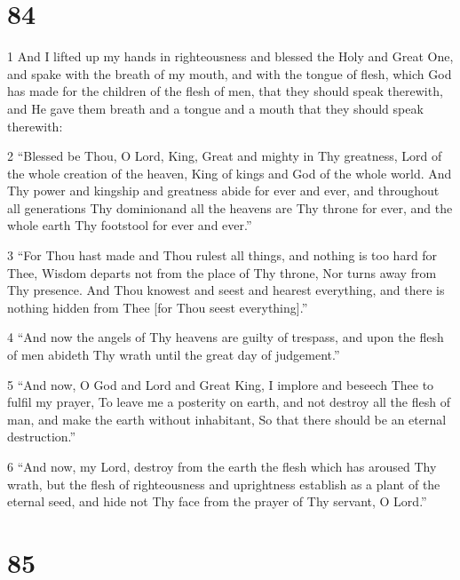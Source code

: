 \chapter{84}

\par 1 And I lifted up my hands in righteousness and blessed the Holy and Great One, and spake with the breath of my mouth, and with the tongue of flesh, which God has made for the children of the flesh of men, that they should speak therewith, and He gave them breath and a tongue and a mouth that they should speak therewith:
\par 2 “Blessed be Thou, O Lord, King, Great and mighty in Thy greatness, Lord of the whole creation of the heaven, King of kings and God of the whole world. And Thy power and kingship and greatness abide for ever and ever, and throughout all generations Thy dominionand all the heavens are Thy throne for ever, and the whole earth Thy footstool for ever and ever.”
\par 3 “For Thou hast made and Thou rulest all things, and nothing is too hard for Thee, Wisdom departs not from the place of Thy throne, Nor turns away from Thy presence. And Thou knowest and seest and hearest everything, and there is nothing hidden from Thee [for Thou seest everything].”
\par 4 “And now the angels of Thy heavens are guilty of trespass, and upon the flesh of men abideth Thy wrath until the great day of judgement.”
\par 5 “And now, O God and Lord and Great King, I implore and beseech Thee to fulfil my prayer, To leave me a posterity on earth, and not destroy all the flesh of man, and make the earth without inhabitant, So that there should be an eternal destruction.”
\par 6 “And now, my Lord, destroy from the earth the flesh which has aroused Thy wrath, but the flesh of righteousness and uprightness establish as a plant of the eternal seed, and hide not Thy face from the prayer of Thy servant, O Lord.”

\chapter{85}

